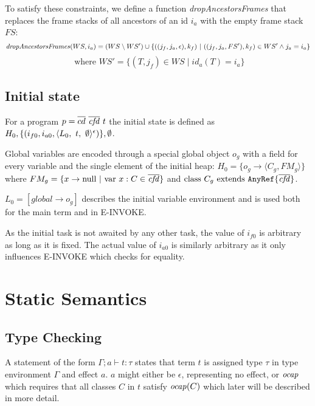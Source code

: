 To satisfy these constraints, we define a function \textit{dropAncestorsFrames} that replaces the frame stacks of all ancestors of an id $i_a$ with the empty frame stack $FS$:
\[
    \mathop{\mathit{dropAncestorsFrames}}(WS, i_a) = (WS \setminus WS') \cup \{((j_f, j_a, \epsilon), k_f)\ |\ ((j_f, j_a, FS'), k_f) \in WS' \wedge j_a = i_a\}
\]\[
    \text{ where } WS' = \{ (T, j_f) \in WS \mid id_a(T) = i_a\}
\]


\subsection{Initial state}
For a program $p = \overline{cd}\ \overline{\vn{cfd}}\ t$ the initial state is defined as $H_0, \{(i_{f0}, i_{a0}, \sframe[L_0]{t}[\emptyset][\epsilon])\}, \emptyset$.

Global variables are encoded through a special global object $o_g$ with a field for every variable and the single element of the initial heap: $H_0 = \{o_g \rightarrow \langle C_g, FM_g \rangle\}$ where $FM_g = \{x \rightarrow \text{null} \ |\ \text{var } x : C \in \overline{\vn{cfd}}\}$ and $\text{class } C_g \text{ extends } \texttt{AnyRef} \{ \overline{\mathop{\mathit{cfd}}} \}$.

$L_0 = [global \rightarrow o_g]$ describes the initial variable environment and is used both for the main term and in E-INVOKE.

As the initial task is not awaited by any other task, the value of $i_{f0}$ is arbitrary as long as it is fixed. The actual value of $i_{a0}$ is similarly arbitrary as it only influences E-INVOKE which checks for equality.

\section{Static Semantics}\label{sec:static-semantics}
\subsection{Type Checking}
A statement of the form $\Gamma; a \vdash t : \tau$ states that term $t$ is assigned type $\tau$ in type environment $\Gamma$ and effect $a$. $a$ might either be $\epsilon$, representing no effect, or $\mathop{\mathit{ocap}}$ which requires that all classes $C$ in $t$ satisfy $\mathop{\mathit{ocap}}(C)$ which later will be described in more detail.

